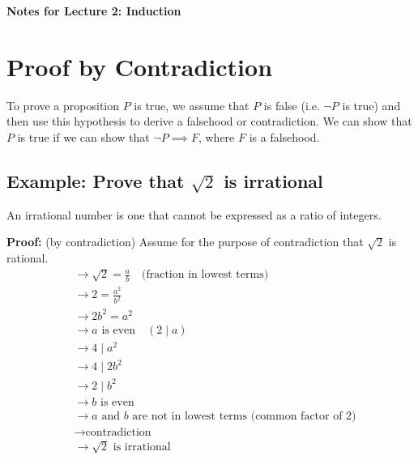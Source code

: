 \documentclass[11pt]{article}
\begin{document}
\thispagestyle{firstpage}

\vspace*{0cm} %

\begin{center}
    \Large \textbf{Notes for Lecture 2: Induction}
\end{center}

\vspace{1cm} %

\section{Proof by Contradiction}
To prove a proposition \( P \) is true, we assume that \( P \) is false (i.e. \( \neg P \) is true) and then use this hypothesis to derive a falsehood or contradiction. We can show that \( P \) is true if we can show that \( \neg P \implies F \), where \( F \) is a falsehood.

\subsection*{Example: Prove that \( \sqrt{2} \) is irrational}
An irrational number is one that cannot be expressed as a ratio of integers.

\textbf{Proof:} (by contradiction)
Assume for the purpose of contradiction that \( \sqrt{2} \) is rational.
\begin{align*}
    &\rightarrow \sqrt{2} = \frac{a}{b} \quad \text{(fraction in lowest terms)} \\
    &\rightarrow 2 = \frac{a^2}{b^2} \\
    &\rightarrow 2b^2 = a^2 \\
    &\rightarrow a \text{ is even} \quad (2 \mid a) \\
    &\rightarrow 4 \mid a^2 \\
    &\rightarrow 4 \mid 2b^2 \\
    &\rightarrow 2 \mid b^2 \\
    &\rightarrow b \text{ is even} \\
    &\rightarrow a \text{ and } b \text{ are not in lowest terms (common factor of 2)} \\
    &\rightarrow \text{contradiction} \\
    &\rightarrow \sqrt{2} \text{ is irrational}
\end{align*}
\end{document}

